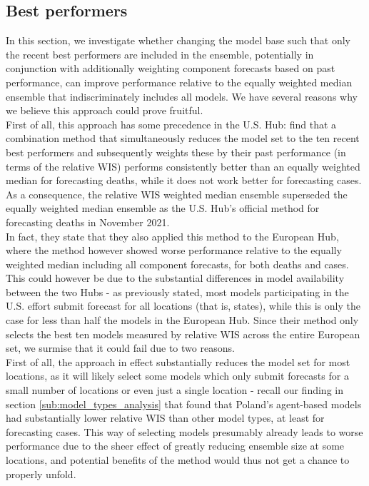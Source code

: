 \subsection{Best performers} \label{sub:best_performers}
In this section, we investigate whether changing the model base such that only the recent best performers are included in the ensemble, potentially in conjunction with additionally weighting component forecasts based on past performance, can improve performance relative to the equally weighted median ensemble that indiscriminately includes all models. We have several reasons why we believe this approach could prove fruitful. \medskip\\
First of all, this approach has some precedence in the U.S. Hub: \cite{ray_comparing_2022} find that a combination method that simultaneously reduces the model set to the ten recent best performers and subsequently weights these by their past performance (in terms of the relative WIS) performs consistently better than an equally weighted median for forecasting deaths, while it does not work better for forecasting cases. As a consequence, the relative WIS weighted median ensemble superseded the equally weighted median ensemble as the U.S. Hub's official method for forecasting deaths in November 2021.\\ 
In fact, they state that they also applied this method to the European Hub, where the method however showed worse performance relative to the equally weighted median including all component forecasts, for both deaths and cases. This could however be due to the substantial differences in model availability between the two Hubs - as previously stated, most models participating in the U.S. effort submit forecast for all locations (that is, states), while this is only the case for less than half the models in the European Hub. Since their method only selects the best ten models measured by relative WIS across the entire European set, we surmise that it could fail due to two reasons.\\
First of all, the approach in effect substantially reduces the model set for most locations, as it will likely select some models which only submit forecasts for a small number of locations or even just a single location - recall our finding in section \ref{sub:model_types_analysis} that found that Poland's agent-based models had substantially lower relative WIS than other model types, at least for forecasting cases. This way of selecting models presumably already leads to worse performance due to the sheer effect of greatly reducing ensemble size at some locations, and potential benefits of the method would thus not get a chance to properly unfold.\\

